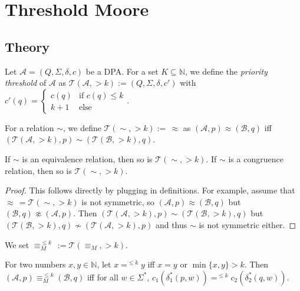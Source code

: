 \chapter{Threshold Moore}
\label{chap:tm}

\section{Theory}

\begin{defn}
	Let $\mathcal{A} = (Q, \Sigma, \delta, c)$ be a DPA. For a set $K \subseteq \mathbb{N}$, we define the \emph{priority threshold} of $\mathcal{A}$ as $\mathcal{T}(\mathcal{A}, >k) := (Q, \Sigma, \delta, c')$ with $c'(q) = \begin{cases} c(q) & \text{if } c(q) \leq k \\ k + 1 & \text{else} \end{cases}$.
	
	For a relation $\sim$, we define $\mathcal{T}(\sim, >k) :=\, \approx$ as $(\mathcal{A}, p) \approx (\mathcal{B}, q)$ iff $(\mathcal{T}(\mathcal{A}, >k), p) \sim (\mathcal{T}(\mathcal{B}, >k), q)$.
\end{defn}

\begin{lem}
	If $\sim$ is an equivalence relation, then so is $\mathcal{T}(\sim, >k)$. If $\sim$ is a congruence relation, then so is $\mathcal{T}(\sim, >k)$.
\end{lem}

\begin{proof}
	This follows directly by plugging in definitions. For example, assume that $\approx \,= \mathcal{T}(\sim, >k)$ is not symmetric, so $(\mathcal{A}, p) \approx (\mathcal{B}, q)$ but $(\mathcal{B}, q) \not\approx (\mathcal{A}, p)$. Then $(\mathcal{T}(\mathcal{A}, >k), p) \sim (\mathcal{T}(\mathcal{B}, >k), q)$ but $(\mathcal{T}(\mathcal{B}, >k), q) \not\sim (\mathcal{T}(\mathcal{A}, >k), p)$ and thus $\sim$ is not symmetric either.
\end{proof}

\begin{defn}
	We set $\equiv_M^{\leq k} \,:= \mathcal{T}(\equiv_M, >k)$.
\end{defn}

\begin{lem}
	For two numbers $x, y \in \mathbb{N}$, let $x =^{\leq k} y$ iff $x = y$ or $\min \{x, y\} > k$. Then $(\mathcal{A}, p) \equiv_M^{\leq k} (\mathcal{B}, q)$ iff for all $w \in \Sigma^*$, $c_1(\delta_1^*(p, w)) =^{\leq k} c_2(\delta_2^*(q, w))$.
\end{lem}

